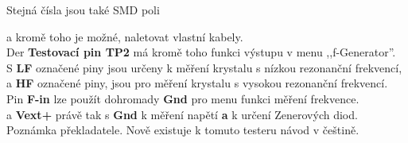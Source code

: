 Stejná čísla jsou také SMD poli

a kromě toho je možné, naletovat vlastní kabely.\\ 

Der {\bf Testovací pin TP2} má kromě toho funkci výstupu v menu ,,f-Generator''.
\\S {\bf LF} označené piny jsou určeny k měření krystalu s nízkou rezonanční frekvencí,
\\a {\bf HF} označené piny, jsou pro měření krystalu s vysokou rezonanční frekvencí.
\\
Pin {\bf F-in} lze použít dohromady {\bf Gnd} pro menu funkci měření frekvence.
\\a {\bf Vext+} právě tak s {\bf Gnd} k měření napětí {\bf a} k určení Zenerových diod.\\

Poznámka překladatele. Nově existuje k tomuto testeru návod v češtině.

